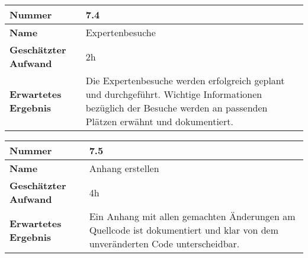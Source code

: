 \begin{longtable}{p{}|p{}}
	\hline
	\textbf{Nummer}                 & \textbf{7.4}            \\
	\hline
	\textbf{Name}   				& Expertenbesuche                  \\
	\hline
	\textbf{Geschätzter Aufwand}    & 2h                                    \\
	\hline
	\textbf{Erwartetes Ergebnis}    & Die Expertenbesuche werden erfolgreich geplant und durchgeführt. Wichtige Informationen bezüglich der Besuche werden an passenden Plätzen erwähnt und dokumentiert.                                    \\
	\hline
\end{longtable}\label{tab:rahmenaufgaben-7.4}

\begin{longtable}{p{}|p{}}
	\hline
	\textbf{Nummer}                 & \textbf{7.5}            \\
	\hline
	\textbf{Name}   				& Anhang erstellen                  \\
	\hline
	\textbf{Geschätzter Aufwand}    & 4h                                    \\
	\hline
	\textbf{Erwartetes Ergebnis}    & Ein Anhang mit allen gemachten Änderungen am Quellcode ist dokumentiert und klar von dem unveränderten Code unterscheidbar.                                    \\
	\hline
\end{longtable}\label{tab:rahmenaufgaben-7.5}

\newpage